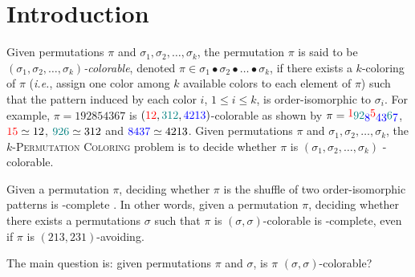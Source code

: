 \section{Introduction}
\label{section:Introduction}

Given permutations $\pi$ and $\sigma_1, \sigma_2, \ldots, \sigma_k$,
the permutation $\pi$ is said to be
\emph{$(\sigma_1, \sigma_2, \ldots, \sigma_k)$-colorable},
denoted $\pi \in \sigma_1 \bullet \sigma_2 \bullet \dots \bullet \sigma_k$,
if there exists a $k$-coloring of $\pi$ (\emph{i.e.}, assign one color
among $k$ available colors to each element of $\pi$) such that the
pattern induced by each color $i$, $1 \leq i \leq k$, is order-isomorphic
to $\sigma_i$.
For example, $\pi = 192854367$ is 
$({\color{red}12}, {\color{teal}312}, {\color{blue}4213})$-colorable
as shown by 
$\pi = 
\raisebox{2pt}{{\color{red}1}}
\raisebox{0pt}{{\color{teal}92}}
\raisebox{-2pt}{{\color{blue}8}}
\raisebox{2pt}{{\color{red}5}}
\raisebox{-2pt}{{\color{blue}43}}
\raisebox{0pt}{{\color{teal}6}}
\raisebox{-2pt}{{\color{blue}7}}$,
${\color{red}15} \simeq 12$,
${\color{teal}926} \simeq 312$ and
${\color{blue}8437} \simeq 4213$.
Given permutations $\pi$ and $\sigma_1, \sigma_2, \ldots, \sigma_k$,
the \textsc{$k$-Permutation Coloring} problem is to decide whether $\pi$
is $(\sigma_1, \sigma_2, \ldots, \sigma_k)$ -colorable.

Given a permutation $\pi$, deciding whether $\pi$ is the shuffle of 
two order-isomorphic patterns is \NP-complete \cite{DBLP:journals/tcs/GiraudoV18}.
In other words, given a permutation $\pi$, deciding whether 
there exists a permutations $\sigma$ such that $\pi$ is 
$(\sigma, \sigma)$-colorable is \NP-complete,
even if $\pi$ is $(213, 231)$-avoiding.

The main question is: 
given permutations $\pi$ and $\sigma$, is $\pi$ $(\sigma, \sigma)$-colorable?